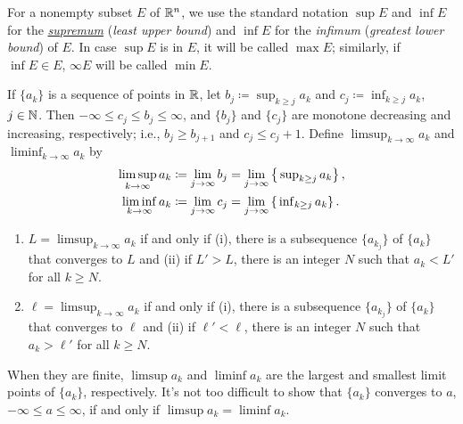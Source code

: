 For a nonempty subset $E$ of $\mathbb{R}^n$, we use the standard notation $\sup
E$ and $\inf E$ for the
\href{https://en.wikipedia.org/wiki/Infimum_and_supremum}{\emph{supremum}}
(\emph{least upper bound}) and $\inf E$ for the \emph{infimum}
(\emph{greatest lower bound}) of $E$. In case $\sup E$ is in $E$, it will
be called $\max E$; similarly, if $\inf E\in E$, $\infty E$ will be called
$\min E$.

If $\{a_k\}$ is a sequence of points in $\mathbb{R}$, let
$b_j\coloneqq\sup_{k\geq j} a_k$ and $c_j\coloneqq\inf_{k\geq j} a_k$,
$j\in\mathbb{N}$. Then $-\infty\leq c_j\leq b_j\leq\infty$, and $\{b_j\}$ and
$\{c_j\}$ are monotone decreasing and increasing, respectively; i.e.,
$b_j\geq b_{j+1}$ and $c_j\leq c_j+1$. Define $\limsup_{k\to\infty}a_k$ and
$\liminf_{k\to\infty}a_k$ by
\begin{equation}
\label{eq:limsup-liminf-definition}
\begin{aligned}
\limsup_{k\to\infty}a_k&\coloneqq\lim_{j\to\infty} b_j
=\lim_{j\to\infty}\left\{\sideset{}{_{k\geq j}}\sup a_k  \right\},\\
\liminf_{k\to\infty}a_k&\coloneqq\lim_{j\to\infty} c_j
=\lim_{j\to\infty}\left\{\sideset{}{_{k\geq j}}\inf a_k\right\}.
\end{aligned}
\end{equation}

\begin{theorem}[1.4]
\hfill
\begin{enumerate}[label=\textnormal{(\alph*)},noitemsep]
\item $L=\limsup_{k\to\infty} a_k$ if and only if \textnormal{(i)}, there
  is a subsequence $\{a_{k_j}\}$ of $\{a_k\}$ that converges to $L$ and
  \textnormal{(ii)} if $L'>L$, there is an integer $N$ such that $a_k<L'$
  for all $k\geq N$.
\item $\ell=\limsup_{k\to\infty} a_k$ if and only if \textnormal{(i)}, there
  is a subsequence $\{a_{k_j}\}$ of $\{a_k\}$ that converges to $\ell$ and
  \textnormal{(ii)} if $\ell'<\ell$, there is an integer $N$ such that
  $a_k>\ell'$ for all $k\geq N$.
\end{enumerate}
\end{theorem}
When they are finite, $\limsup a_k$ and $\liminf a_k$ are the largest and
smallest limit points of $\{a_k\}$, respectively. It's not too difficult to
show that $\{a_k\}$ converges to $a$, $-\infty\leq a\leq\infty$, if and
only if $\limsup a_k=\liminf a_k$.

